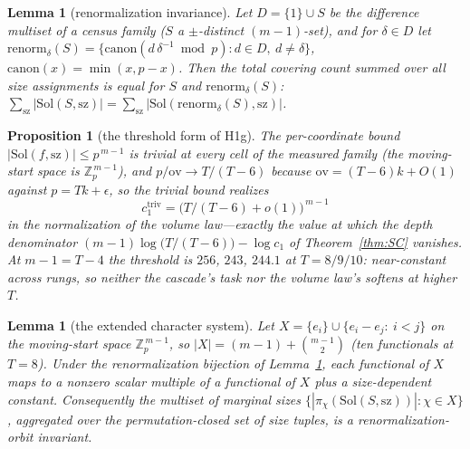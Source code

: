\documentclass[11pt,a4paper]{article}
\numberwithin{equation}{section}
\theoremstyle{plain}
\theoremstyle{plain}
\newtheorem{lemma}[theorem]{Lemma}
\newtheorem{proposition}[theorem]{Proposition}
\theoremstyle{definition}
\theoremstyle{remark}
\newcommand{\Z}{\mathbb{Z}}
\begin{document}
\begin{lemma}[renormalization invariance]\label{lem:renorm}
Let $D=\{1\}\cup S$ be the difference multiset of a census family ($S$
a $\pm$-distinct $(m-1)$-set), and for $\delta\in D$ let
$\mathrm{renorm}_\delta(S)=\{\mathrm{canon}(d\,\delta^{-1}\bmod p):
d\in D,\ d\ne\delta\}$, $\mathrm{canon}(x)=\min(x,p-x)$. Then the total
covering count summed over all size assignments is equal for $S$ and
$\mathrm{renorm}_\delta(S)$:
$\sum_{\mathrm{sz}}|\mathrm{Sol}(S,\mathrm{sz})|
=\sum_{\mathrm{sz}}|\mathrm{Sol}(\mathrm{renorm}_\delta(S),
\mathrm{sz})|$.
\end{lemma}

\begin{proposition}[the threshold form of H1g]\label{prop:threshold}
The per-coordinate bound $|\mathrm{Sol}(f,\mathrm{sz})|\le p^{\,m-1}$
is trivial at every cell of the measured family (the
moving-start space is $\Z_p^{\,m-1}$), and $p/\mathrm{ov}\to T/(T-6)$
because $\mathrm{ov}=(T-6)k+O(1)$ against $p=Tk+\epsilon$, so the
trivial bound realizes
\[
c_1^{\mathrm{triv}}=\bigl(T/(T-6)+o(1)\bigr)^{\,m-1}
\]
in the normalization of the volume law---exactly the value at which
the depth denominator $(m-1)\log\bigl(T/(T-6)\bigr)-\log c_1$ of
Theorem~\ref{thm:SC} vanishes. At $m-1=T-4$ the threshold is $256$,
$243$, $244.1$ at $T=8/9/10$: near-constant across rungs, so neither
the cascade's task nor the volume law's softens at higher $T$.
\end{proposition}

\begin{lemma}[the extended character system]\label{lem:char10}
Let $X=\{e_i\}\cup\{e_i-e_j:\ i<j\}$ on the moving-start space
$\Z_p^{\,m-1}$, so $|X|=(m-1)+\binom{m-1}{2}$ (ten functionals at
$T=8$). Under the renormalization bijection of Lemma~\ref{lem:renorm},
each functional of $X$ maps to a nonzero scalar multiple of a
functional of $X$ plus a size-dependent constant. Consequently the
multiset of marginal sizes
$\{|\pi_\chi(\mathrm{Sol}(S,\mathrm{sz}))|:\chi\in X\}$, aggregated
over the permutation-closed set of size tuples, is a
renormalization-orbit invariant.
\end{lemma}
\end{document}
